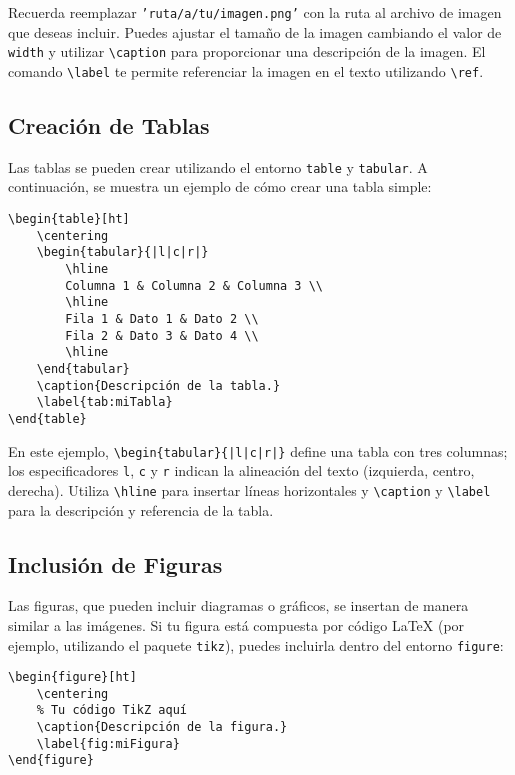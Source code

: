 \documentclass[11pt]{article}
\begin{document}
Recuerda reemplazar \texttt{'ruta/a/tu/imagen.png'} con la ruta al archivo de imagen que deseas incluir. Puedes ajustar el tamaño de la imagen cambiando el valor de \texttt{width} y utilizar \texttt{\textbackslash caption} para proporcionar una descripción de la imagen. El comando \texttt{\textbackslash label} te permite referenciar la imagen en el texto utilizando \texttt{\textbackslash ref}.

\subsection{Creación de Tablas}

Las tablas se pueden crear utilizando el entorno \texttt{table} y \texttt{tabular}. A continuación, se muestra un ejemplo de cómo crear una tabla simple:

\begin{verbatim}
\begin{table}[ht]
    \centering
    \begin{tabular}{|l|c|r|}
        \hline
        Columna 1 & Columna 2 & Columna 3 \\
        \hline
        Fila 1 & Dato 1 & Dato 2 \\
        Fila 2 & Dato 3 & Dato 4 \\
        \hline
    \end{tabular}
    \caption{Descripción de la tabla.}
    \label{tab:miTabla}
\end{table}
\end{verbatim}

En este ejemplo, \texttt{\textbackslash begin\{tabular\}\{|l|c|r|\}} define una tabla con tres columnas; los especificadores \texttt{l}, \texttt{c} y \texttt{r} indican la alineación del texto (izquierda, centro, derecha). Utiliza \texttt{\textbackslash hline} para insertar líneas horizontales y \texttt{\textbackslash caption} y \texttt{\textbackslash label} para la descripción y referencia de la tabla.

\subsection{Inclusión de Figuras}

Las figuras, que pueden incluir diagramas o gráficos, se insertan de manera similar a las imágenes. Si tu figura está compuesta por código LaTeX (por ejemplo, utilizando el paquete \texttt{tikz}), puedes incluirla dentro del entorno \texttt{figure}:

\begin{verbatim}
\begin{figure}[ht]
    \centering
    % Tu código TikZ aquí
    \caption{Descripción de la figura.}
    \label{fig:miFigura}
\end{figure}
\end{verbatim}
\end{document}

